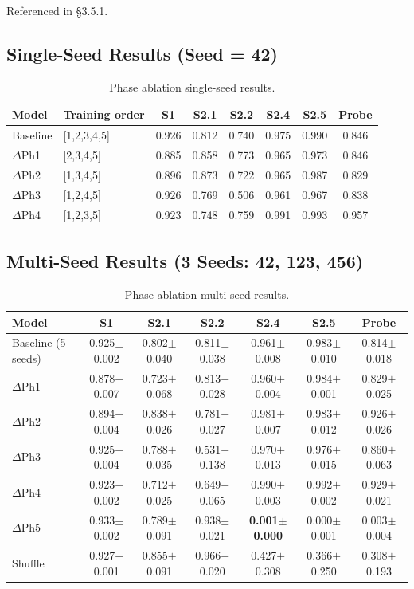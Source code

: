 \documentclass{article}
\begin{document}
Referenced in \S3.5.1.

\subsection{Single-Seed Results (Seed = 42)}

\begin{table}[htbp]
\centering
\small
\caption{Phase ablation single-seed results.}
\label{tab:ablation_single}
\begin{tabular}{llcccccc}
\toprule
Model & Training order & S1 & S2.1 & S2.2 & S2.4 & S2.5 & Probe \\
\midrule
Baseline & [1,2,3,4,5] & 0.926 & 0.812 & 0.740 & 0.975 & 0.990 & 0.846 \\
$\Delta$Ph1 & [2,3,4,5] & 0.885 & 0.858 & 0.773 & 0.965 & 0.973 & 0.846 \\
$\Delta$Ph2 & [1,3,4,5] & 0.896 & 0.873 & 0.722 & 0.965 & 0.987 & 0.829 \\
$\Delta$Ph3 & [1,2,4,5] & 0.926 & 0.769 & 0.506 & 0.961 & 0.967 & 0.838 \\
$\Delta$Ph4 & [1,2,3,5] & 0.923 & 0.748 & 0.759 & 0.991 & 0.993 & 0.957 \\
\bottomrule
\end{tabular}
\end{table}

\subsection{Multi-Seed Results (3 Seeds: 42, 123, 456)}

\begin{table}[htbp]
\centering
\small
\caption{Phase ablation multi-seed results.}
\label{tab:ablation_multi}
\begin{tabular}{lcccccc}
\toprule
Model & S1 & S2.1 & S2.2 & S2.4 & S2.5 & Probe \\
\midrule
Baseline (5 seeds) & 0.925$\pm$0.002 & 0.802$\pm$0.040 & 0.811$\pm$0.038 & 0.961$\pm$0.008 & 0.983$\pm$0.010 & 0.814$\pm$0.018 \\
$\Delta$Ph1 & 0.878$\pm$0.007 & 0.723$\pm$0.068 & 0.813$\pm$0.028 & 0.960$\pm$0.004 & 0.984$\pm$0.001 & 0.829$\pm$0.025 \\
$\Delta$Ph2 & 0.894$\pm$0.004 & 0.838$\pm$0.026 & 0.781$\pm$0.027 & 0.981$\pm$0.007 & 0.983$\pm$0.012 & 0.926$\pm$0.026 \\
$\Delta$Ph3 & 0.925$\pm$0.004 & 0.788$\pm$0.035 & 0.531$\pm$0.138 & 0.970$\pm$0.013 & 0.976$\pm$0.015 & 0.860$\pm$0.063 \\
$\Delta$Ph4 & 0.923$\pm$0.002 & 0.712$\pm$0.025 & 0.649$\pm$0.065 & 0.990$\pm$0.003 & 0.992$\pm$0.002 & 0.929$\pm$0.021 \\
$\Delta$Ph5 & 0.933$\pm$0.002 & 0.789$\pm$0.091 & 0.938$\pm$0.021 & \textbf{0.001$\pm$0.000} & 0.000$\pm$0.001 & 0.003$\pm$0.004 \\
Shuffle & 0.927$\pm$0.001 & 0.855$\pm$0.091 & 0.966$\pm$0.020 & 0.427$\pm$0.308 & 0.366$\pm$0.250 & 0.308$\pm$0.193 \\
\bottomrule
\end{tabular}
\end{table}
\end{document}
